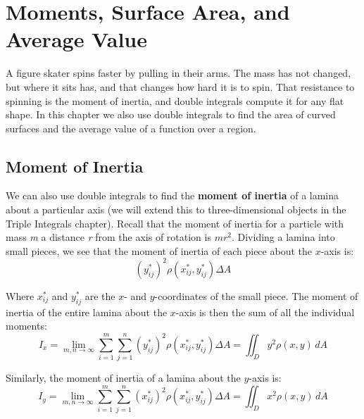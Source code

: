 \chapter{Moments, Surface Area, and Average Value}

A figure skater spins faster by pulling in their arms. The mass has not
changed, but where it sits has, and that changes how hard it is to spin. That
resistance to spinning is the moment of inertia, and double integrals compute
it for any flat shape. In this chapter we also use double integrals to find
the area of curved surfaces and the average value of a function over a region.

\section{Moment of Inertia}
We can also use double integrals to find the \textbf{moment of inertia} of a lamina about a particular axis (we will extend this to 
three-dimensional objects in the Triple Integrals chapter). Recall that the
moment of inertia for a particle with mass \textit{m} a distance \textit{r} 
from the axis of rotation is $mr^2$. Dividing a lamina into small pieces, we 
see that the moment of inertia of each piece about the $x$-axis is:
$$\left( y_{ij}^* \right)^2 \rho \left( x_{ij}^* , y_{ij}^* \right) \Delta A$$

Where $x_{ij}^*$ and $y_{ij}^*$ are the $x$- and $y$-coordinates of the small 
piece. The moment of inertia of the entire lamina about the $x$-axis is then 
the sum of all the individual moments:
$$I_x = \lim_{m, n \to \infty} \sum_{i = 1}^m \sum_{j = 1}^n \left( y_{ij}^* \right)^2 \rho \left( x_{
ij}^* , y_{ij}^* \right) \Delta A = \iint_{\textit{D}} y^2 \rho \left(x, y 
\right) \,dA$$

Similarly, the moment of inertia of a lamina about the $y$-axis is:
$$I_y = \lim_{m, n \to \infty} \sum_{i = 1}^m \sum_{j = 1}^n \left( x_{ij}^* \right)^2 \rho \left( x_{
ij}^* , y_{ij}^* \right) \Delta A = \iint_{\textit{D}} x^2 \rho \left(x, y 
\right) \,dA$$

